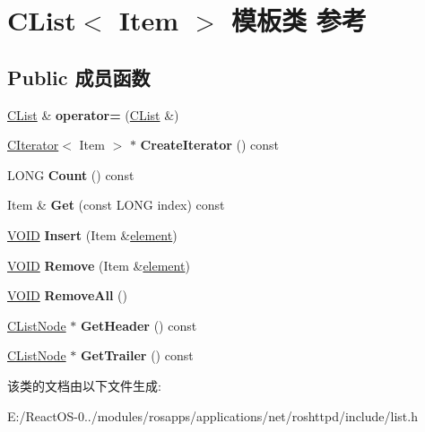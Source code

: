 \hypertarget{class_c_list}{}\section{C\+List$<$ Item $>$ 模板类 参考}
\label{class_c_list}
\subsection*{Public 成员函数}
\begin{DoxyCompactItemize}
\item 
\mbox{\label{class_c_list_a3e45f0a6abfbd801ea4c176ab271f137}} 
\hyperlink{class_c_list}{C\+List} \& {\bfseries operator=} (\hyperlink{class_c_list}{C\+List} \&)
\item 
\mbox{\label{class_c_list_aa0e24935e921e3ad9deb46d4dcc923ba}} 
\hyperlink{class_c_iterator}{C\+Iterator}$<$ Item $>$ $\ast$ {\bfseries Create\+Iterator} () const
\item 
\mbox{\label{class_c_list_a5c9f6a8af0f7f408f2ce42bd7e13b312}} 
L\+O\+NG {\bfseries Count} () const
\item 
\mbox{\label{class_c_list_abea56e66ac241263d34ae83d9604dc52}} 
Item \& {\bfseries Get} (const L\+O\+NG index) const
\item 
\mbox{\label{class_c_list_a7658b379b83f93b6ac227640417901ec}} 
\hyperlink{interfacevoid}{V\+O\+ID} {\bfseries Insert} (Item \&\hyperlink{structelement}{element})
\item 
\mbox{\label{class_c_list_abaa67fe27f960ce802c905386d1454e4}} 
\hyperlink{interfacevoid}{V\+O\+ID} {\bfseries Remove} (Item \&\hyperlink{structelement}{element})
\item 
\mbox{\label{class_c_list_ae66d13c5bb001c9791e6607727afac35}} 
\hyperlink{interfacevoid}{V\+O\+ID} {\bfseries Remove\+All} ()
\item 
\mbox{\label{class_c_list_a1118d04f6361d231b0604ca3a0482ceb}} 
\hyperlink{class_c_list_node}{C\+List\+Node} $\ast$ {\bfseries Get\+Header} () const
\item 
\mbox{\label{class_c_list_ac5cc3f01934dfcbcf39ef672981002de}} 
\hyperlink{class_c_list_node}{C\+List\+Node} $\ast$ {\bfseries Get\+Trailer} () const
\end{DoxyCompactItemize}


该类的文档由以下文件生成\+:\begin{DoxyCompactItemize}
\item 
E\+:/\+React\+O\+S-\/0../modules/rosapps/applications/net/roshttpd/include/list.\+h\end{DoxyCompactItemize}

